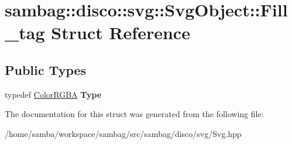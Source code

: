 \hypertarget{structsambag_1_1disco_1_1svg_1_1_svg_object_1_1_fill__tag}{
\section{sambag::disco::svg::SvgObject::Fill\_\-tag Struct Reference}
\label{structsambag_1_1disco_1_1svg_1_1_svg_object_1_1_fill__tag}
}
\subsection*{Public Types}
\begin{DoxyCompactItemize}
\item 
\hypertarget{structsambag_1_1disco_1_1svg_1_1_svg_object_1_1_fill__tag_a66e97b3cad6eaf308ef4e906a0c54366}{
typedef \hyperlink{structsambag_1_1com_1_1_color_r_g_b_a}{ColorRGBA} {\bfseries Type}}
\label{structsambag_1_1disco_1_1svg_1_1_svg_object_1_1_fill__tag_a66e97b3cad6eaf308ef4e906a0c54366}

\end{DoxyCompactItemize}


The documentation for this struct was generated from the following file:\begin{DoxyCompactItemize}
\item 
/home/samba/workspace/sambag/src/sambag/disco/svg/Svg.hpp\end{DoxyCompactItemize}
